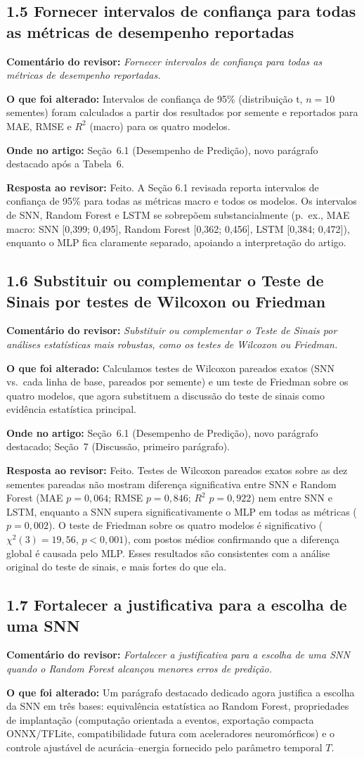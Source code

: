 \documentclass[11pt,a4paper]{article}
\newcommand{\comment}[1]{\textbf{Comentário do revisor:} \textit{#1}}
\newcommand{\change}[1]{\textbf{O que foi alterado:} #1}
\newcommand{\where}[1]{\textbf{Onde no artigo:} #1}
\newcommand{\resp}[1]{\textbf{Resposta ao revisor:} \textcolor{revblue}{#1}}
\newcommand{\pt}[1]{\subsection*{#1}}
\begin{document}
\pt{1.5 Fornecer intervalos de confiança para todas as métricas de desempenho reportadas}
\comment{Fornecer intervalos de confiança para todas as métricas de desempenho reportadas.}

\change{Intervalos de confiança de 95\% (distribuição t, $n=10$ sementes) foram calculados a partir dos resultados por semente e reportados para MAE, RMSE e $R^2$ (macro) para os quatro modelos.}

\where{Seção~6.1 (Desempenho de Predição), novo parágrafo destacado após a Tabela~6.}

\resp{Feito. A Seção 6.1 revisada reporta intervalos de confiança de 95\% para todas as métricas macro e todos os modelos. Os intervalos de SNN, Random Forest e LSTM se sobrepõem substancialmente (p.~ex., MAE macro: SNN [0,399; 0,495], Random Forest [0,362; 0,456], LSTM [0,384; 0,472]), enquanto o MLP fica claramente separado, apoiando a interpretação do artigo.}

\pt{1.6 Substituir ou complementar o Teste de Sinais por testes de Wilcoxon ou Friedman}
\comment{Substituir ou complementar o Teste de Sinais por análises estatísticas mais robustas, como os testes de Wilcoxon ou Friedman.}

\change{Calculamos testes de Wilcoxon pareados exatos (SNN vs.\ cada linha de base, pareados por semente) e um teste de Friedman sobre os quatro modelos, que agora substituem a discussão do teste de sinais como evidência estatística principal.}

\where{Seção~6.1 (Desempenho de Predição), novo parágrafo destacado; Seção~7 (Discussão, primeiro parágrafo).}

\resp{Feito. Testes de Wilcoxon pareados exatos sobre as dez sementes pareadas não mostram diferença significativa entre SNN e Random Forest (MAE $p=0{,}064$; RMSE $p=0{,}846$; $R^2$ $p=0{,}922$) nem entre SNN e LSTM, enquanto a SNN supera significativamente o MLP em todas as métricas ($p=0{,}002$). O teste de Friedman sobre os quatro modelos é significativo ($\chi^2(3)=19{,}56$, $p<0{,}001$), com postos médios confirmando que a diferença global é causada pelo MLP. Esses resultados são consistentes com a análise original do teste de sinais, e mais fortes do que ela.}

\pt{1.7 Fortalecer a justificativa para a escolha de uma SNN}
\comment{Fortalecer a justificativa para a escolha de uma SNN quando o Random Forest alcançou menores erros de predição.}

\change{Um parágrafo destacado dedicado agora justifica a escolha da SNN em três bases: equivalência estatística ao Random Forest, propriedades de implantação (computação orientada a eventos, exportação compacta ONNX/TFLite, compatibilidade futura com aceleradores neuromórficos) e o controle ajustável de acurácia--energia fornecido pelo parâmetro temporal $T$.}
\end{document}

